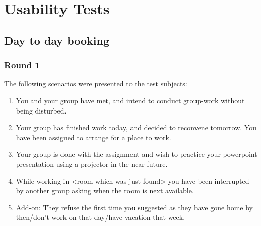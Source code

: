 \section{Usability Tests}
\label{app:tests}
\subsection{Day to day booking}
\subsubsection{Round 1}
The following scenarios were presented to the test subjects:
\begin{enumerate}
\item You and your group have met, and intend to conduct group-work without being disturbed.
\item Your group has finished work today, and decided to reconvene tomorrow. You have been assigned to arrange for a place to work.
\item Your group is done with the assignment and wish to practice your powerpoint presentation using a projector in the near future.
\item While working in <room which was just found> you have been interrupted by another group asking when the room is next available.
\item Add-on: They refuse the first time you suggested as they have gone home by then/don't work on that day/have vacation that week.
\end{enumerate}

